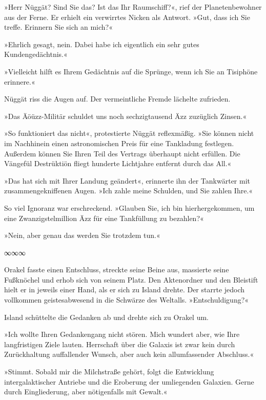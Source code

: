 »Herr Nüggät? Sind Sie das? Ist das Ihr Raumschiff?«, rief der Planetenbewohner aus der Ferne. Er erhielt ein verwirrtes Nicken als Antwort. »Gut, dass ich Sie treffe. Erinnern Sie sich an mich?«

»Ehrlich gesagt, nein. Dabei habe ich eigentlich ein sehr gutes Kundengedächtnis.«

»Vielleicht hilft es Ihrem Gedächtnis auf die Sprünge, wenn ich Sie an Tisiphöne erinnere.«

Nüggät riss die Augen auf. Der vermeintliche Fremde lächelte zufrieden.

»Das Äöüzz-Militär schuldet uns noch sechzigtausend Äzz zuzüglich Zinsen.«

»So funktioniert das nicht«, protestierte Nüggät reflexmäßig. »Sie können nicht im Nachhinein einen astronomischen Preis für eine Tankladung festlegen. Außerdem können Sie Ihren Teil des Vertrags überhaupt nicht erfüllen. Die Vängefül Destrüktiön fliegt hunderte Lichtjahre entfernt durch das All.«

»Das hat sich mit Ihrer Landung geändert«, erinnerte ihn der Tankwärter mit zusammengekniffenen Augen. »Ich zahle meine Schulden, und Sie zahlen Ihre.«

So viel Ignoranz war erschreckend. »Glauben Sie, ich bin hierhergekommen, um eine Zwanzigstelmillion Äzz für eine Tankfüllung zu bezahlen?«

»Nein, aber genau das werden Sie trotzdem tun.«

\begin{center}
∞∞∞
\end{center}

Orakel fasste einen Entschluss, streckte seine Beine aus, massierte seine Fußknöchel und erhob sich von seinem Platz. Den Aktenordner und den Bleistift hielt er in jeweils einer Hand, als er sich zu Island drehte. Der starrte jedoch vollkommen geistesabwesend in die Schwärze des Weltalls. »Entschuldigung?«

Island schüttelte die Gedanken ab und drehte sich zu Orakel um.

»Ich wollte Ihren Gedankengang nicht stören. Mich wundert aber, wie Ihre langfristigen Ziele lauten. Herrschaft über die Galaxis ist zwar kein durch Zurückhaltung auffallender Wunsch, aber auch kein allumfassender Abschluss.«

»Stimmt. Sobald mir die Milchstraße gehört, folgt die Entwicklung intergalaktischer Antriebe und die Eroberung der umliegenden Galaxien. Gerne durch Eingliederung, aber nötigenfalls mit Gewalt.«

